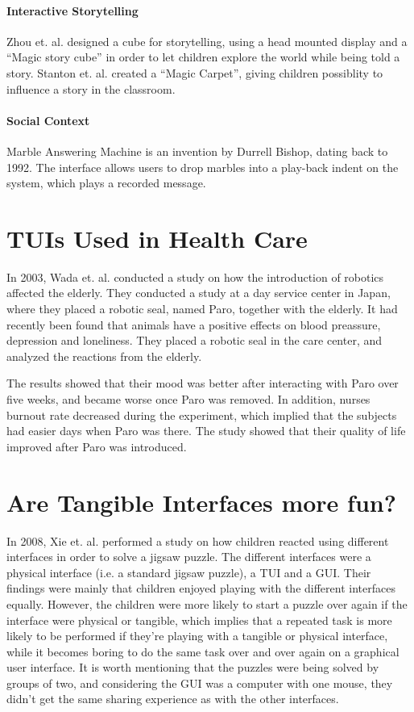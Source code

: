 \paragraph{Interactive Storytelling}
Zhou et. al. designed a cube for storytelling, using a head mounted display and a ``Magic story cube'' in order to let children explore the world while being told a story\cite{zhou2004magic}. Stanton et. al. created a ``Magic Carpet'', giving children possiblity to influence a story in the classroom\cite{stanton2001classroom}. 
 
\paragraph{Social Context}
Marble Answering Machine is an invention by Durrell Bishop, dating back to 1992\cite{crampton1995hand}. The interface allows users to drop marbles into a play-back indent on the system, which plays a recorded message.   

\section{TUIs Used in Health Care}
\label{sec:effectofrobots}
In 2003, Wada et. al. conducted a study on how the introduction of robotics affected the elderly\cite{wada2004effects}. They conducted a study at a day service center in Japan, where they placed a robotic seal, named Paro, together with the elderly. It had recently been found that animals have a positive effects on blood preassure, depression and loneliness. They placed a robotic seal in the care center, and analyzed the reactions from the elderly. 

The results showed that their mood was better after interacting with Paro over five weeks, and became worse once Paro was removed. In addition, nurses burnout rate decreased during the experiment, which implied that the subjects had easier days when Paro was there. The study showed that their quality of life improved after Paro was introduced.           


\section{Are Tangible Interfaces more fun?}
\label{sec:aretuisfun}
In 2008, Xie et. al. performed a study on how children reacted using different interfaces in order to solve a jigsaw puzzle\cite{xie2008tangibles}. The different interfaces were a physical interface (i.e. a standard jigsaw puzzle), a TUI and a GUI. Their findings were mainly that children enjoyed playing with the different interfaces equally. However, the children were more likely to start a puzzle over again if the interface were physical or tangible, which implies that a repeated task is more likely to be performed if they're playing with a tangible or physical interface, while it becomes boring to do the same task over and over again on a graphical user interface. It is worth mentioning that the puzzles were being solved by groups of two, and considering the GUI was a computer with one mouse, they didn't get the same sharing experience as with the other interfaces. 


